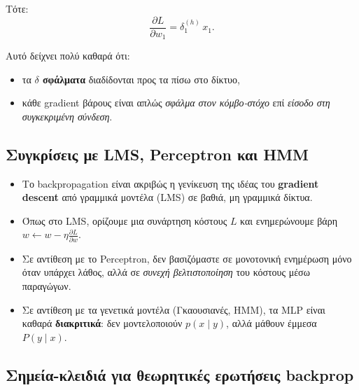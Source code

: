 \documentclass[a4paper,11pt]{article}
\begin{document}
Τότε:
\[
\boxed{
\frac{\partial L}{\partial w_1}
= \delta^{(h)}_1\, x_1.
}
\]

Αυτό δείχνει πολύ καθαρά ότι:
\begin{itemize}
  \item τα \textbf{$\delta$ σφάλματα} διαδίδονται προς τα πίσω στο δίκτυο,
  \item κάθε gradient βάρους είναι απλώς \emph{σφάλμα στον κόμβο-στόχο}
        επί \emph{είσοδο στη συγκεκριμένη σύνδεση}.
\end{itemize}

\subsection{Συγκρίσεις με LMS, Perceptron και HMM}

\begin{itemize}
  \item Το backpropagation είναι ακριβώς η γενίκευση της ιδέας του
        \textbf{gradient descent} από γραμμικά μοντέλα (LMS) σε
        βαθιά, μη γραμμικά δίκτυα.
  \item Όπως στο LMS, ορίζουμε μια συνάρτηση κόστους $L$ και
        ενημερώνουμε βάρη $w \leftarrow w - \eta \frac{\partial L}{\partial w}$.
  \item Σε αντίθεση με το Perceptron, δεν βασιζόμαστε σε μονοτονική
        ενημέρωση μόνο όταν υπάρχει λάθος, αλλά σε \emph{συνεχή βελτιστοποίηση}
        του κόστους μέσω παραγώγων.
  \item Σε αντίθεση με τα γενετικά μοντέλα (Γκαουσιανές, HMM),
        τα MLP είναι καθαρά \textbf{διακριτικά}:
        δεν μοντελοποιούν $p(x\mid y)$, αλλά μάθουν έμμεσα $P(y\mid x)$.
\end{itemize}

\subsection{Σημεία-κλειδιά για θεωρητικές ερωτήσεις backprop}
\end{document}
